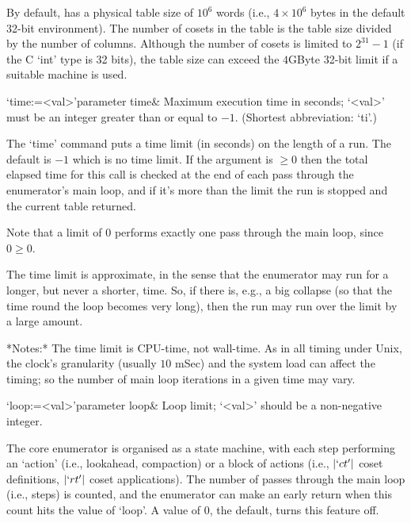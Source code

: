 By default, {\ACE} has a physical table size of $10^6$ words (i.e., $4
\times 10^6$ bytes in the  default 32-bit environment).  The number of
cosets  in the  table  is the  table  size divided  by  the number  of
columns.  Although the  number of cosets is limited  to $2^{31}-1$ (if
the C `int'  type is 32 bits), the table size  can exceed the $4$GByte
32-bit limit if a suitable machine is used.

\>`time:=<val>'{parameter time}&
Maximum execution time in seconds; `<val>' must be an integer greater
than or equal to $-1$. (Shortest abbreviation: `ti'.)

The `time' command  puts a time limit (in seconds) on  the length of a
run. The default is $-1$  which is no  time limit. If the  argument is
$\ge0$ then the total elapsed time for this call is checked at the end
of each pass through the enumerator's main loop, and if it's more than
the limit the run is stopped and the current table returned.

Note that a limit of $0$ performs exactly one pass through the main
loop, since $0 \ge 0$.

%
%
%

The time  limit is approximate, in  the sense that  the enumerator may
run for a longer, but never a shorter, time.  So, if there is, e.g., a
big collapse (so that the time round the loop becomes very long), then
the run may run over the limit by a large amount.

*Notes:*
The time  limit is  CPU-time, not wall-time.   As in all  timing under
Unix, the clock's granularity (usually  $10$ mSec) and the system load
can affect  the timing;  so the  number of main  loop iterations  in a
given time may vary.

\>`loop:=<val>'{parameter loop}&
Loop limit; `<val>' should be a non-negative integer.

The core enumerator is organised as a state machine, with each step
performing an \lq action' (i.e., lookahead, compaction) or a block of
actions (i.e., $|`ct'|$ coset definitions, $|`rt'|$ coset applications).
The number of passes through the main loop (i.e., steps) is counted, and
the enumerator can make an early return when this count hits the
value of `loop'.
A value of $0$, the default, turns this feature off.

